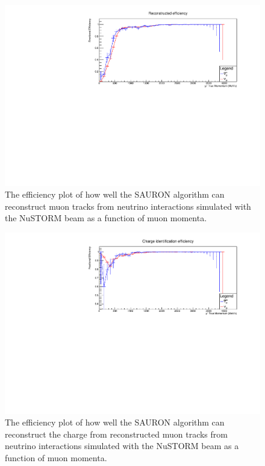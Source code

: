 \begin{figure}[h!]
\centering
\includegraphics[width=.9\textwidth]{figures/NeutrinoChap/Neutrino/NuStormRecEff.pdf}
\caption{The efficiency plot of how well the SAURON algorithm can reconstruct muon tracks from neutrino interactions simulated with the NuSTORM beam as a function of muon momenta.}
\label{fig:NuSTORMTASDfitted}
\end{figure}

\begin{figure}[h!]
\centering
\includegraphics[width=.9\textwidth]{figures/NeutrinoChap/Neutrino/NuStormChargeEff.pdf}
\caption{The efficiency plot of how well the SAURON algorithm can reconstruct the charge from reconstructed muon tracks from neutrino interactions simulated with the NuSTORM beam as a function of muon momenta.}
\label{fig:NuSTORMTASDfittedcharge}
\end{figure}

